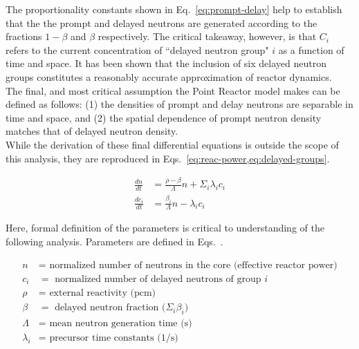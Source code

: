 \documentclass[review,onefignum,onetabnum]{siamart171218}
\begin{document}
The proportionality constants shown in Eq.~\cref{eq:prompt-delay} help to
establish that the the prompt and delayed neutrons are generated according to
the fractions $1-\beta$ and $\beta$ respectively. The critical takeaway, however,
is that $C_i$ refers to the current concentration
of ``delayed neutron group" $i$ as a function of time and space. It has been shown that the inclusion of six
delayed neutron groups constitutes a reasonably accurate approximation of reactor
dynamics.\cite{Keepin} \\

The final, and most critical assumption the Point Reactor model makes can be
defined as follows: (1) the densities of prompt and delay neutrons are separable
in time and space, and (2) the spatial dependence of prompt neutron density matches
that of delayed neutron density. \\

While the derivation of these final differential equations is outside the scope
of this analysis, they are reproduced in Eqs.~\cref{eq:reac-power,eq:delayed-groups}.

\begin{align}
  \label{eq:reac-power}
  \frac{dn}{dt} &= \frac{\rho - \beta}{\Lambda}n + \Sigma_i\lambda_i c_i \\
  \label{eq:delayed-groups}
  \frac{dc_i}{dt} &= \frac{\beta_i}{\Lambda}n - \lambda_i c_i
\end{align}

Here, formal definition of the parameters is critical to understanding of the
following analysis. Parameters are defined in Eqs.~.

\begin{align}
  \label{eq:param_1}
  n &= \text{ normalized number of neutrons in the core (effective reactor power)} \\
  \label{eq:param_2}
  c_i &= \text{ normalized number of delayed neutrons of group $i$} \\
  \label{eq:param_3}
  \rho &= \text{ external reactivity (pcm) } \\
  \label{eq:param_4}
  \beta &= \text{ delayed neutron fraction ($\Sigma_i \beta_i$) } \\
  \label{eq:param_5}
  \Lambda &= \text{ mean neutron generation time (s)} \\
  \label{eq:param_6}
  \lambda_i &= \text{ precursor time constants (1/s)}
\end{align}
\end{document}

